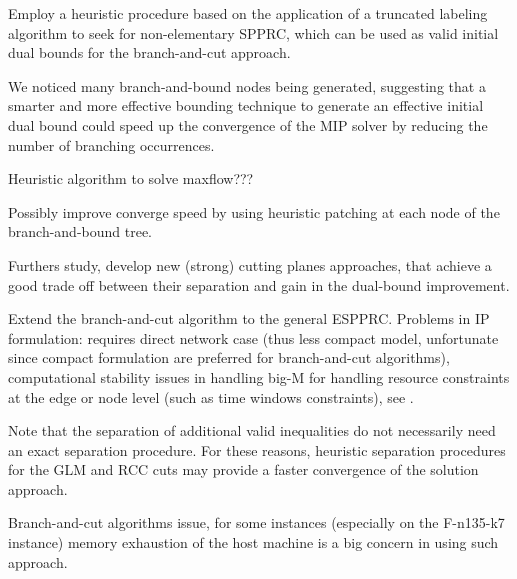 Employ a heuristic procedure based on
the application of a truncated labeling algorithm
to seek for non-elementary SPPRC, which can be used as valid initial
dual bounds for the branch-and-cut approach.

\medskip

We noticed many branch-and-bound nodes being generated,
suggesting that a smarter and more effective bounding technique to
generate an effective initial dual bound could speed up the convergence
of the MIP solver by reducing the number of branching occurrences.

Heuristic algorithm to solve maxflow???

Possibly improve converge speed by using heuristic patching at each
node of the branch-and-bound tree.

Furthers study, develop new (strong) cutting planes approaches,
that achieve a good trade off between their separation and gain
in the dual-bound improvement.

Extend the branch-and-cut algorithm
to the general ESPPRC.
Problems in IP formulation:
requires direct network case (thus less compact model, unfortunate since compact formulation are
preferred for branch-and-cut algorithms),
computational stability issues in handling big-M
for handling resource constraints at the edge or node level (such as time windows constraints),
see \textcite{jepsen2008branchandcut}.

Note that the separation of additional valid inequalities do not
necessarily need an exact separation procedure.
For these reasons, heuristic separation procedures for the GLM and RCC
cuts may provide a faster convergence of the solution approach.

Branch-and-cut algorithms issue, for some instances (especially on the F-n135-k7 instance)
memory exhaustion of the host machine is a big concern in using such approach.


